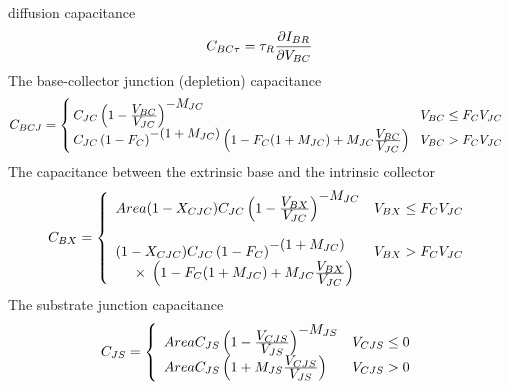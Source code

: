 diffusion capacitance
\begin{equation}
C_{BC\tau} = \tau_R {{\textstyle\partial I_{BR}} \over
       {\textstyle\partial V_{BC}}}
\end{equation}
The base-collector junction (depletion) capacitance
\begin{equation}
C_{BCJ} = \left\{ \! \! \begin{array}{ll}
   C_{JC} \left(1-{{\textstyle V_{BC}}\over
          {\textstyle V_{JC}}}\right)^{\textstyle -M_{JC}}
   & \! V_{BC} \le F_C V_{JC}\\
   C_{JC} \left(1-F_C\right)^{\textstyle -(1+M_{JC})}
          \left(1-F_C(1+M_{JC})+M_{JC}{{\textstyle V_{BC}}\over
          {\textstyle V_{JC}}} \right)
   & \! V_{BC} > F_C V_{JC}
   \end{array} \right. %
\end{equation}
The capacitance between the extrinsic base and the intrinsic
collector
\begin{equation}
C_{BX} = \left\{ \begin{array}{ll}
 Area(1-X_{CJC}) C_{JC} \left(1-{{\textstyle V_{BX}}\over
   {\textstyle V_{JC}}}\right)^{\textstyle -M_{JC}}
   & V_{BX} \le F_C V_{JC}\\ \\
 (1-X_{CJC})
   C_{JC} \left(1-F_C\right)^{\textstyle -(1+M_{JC})}
   & V_{BX} > F_C V_{JC}\\
   \;\;\;\;\;\times\; \left(1-F_C(1+M_{JC})+M_{JC}{{\textstyle V_{BX}}\over
   {\textstyle V_{JC}}} \right)
   &
   \end{array} \right. %
\end{equation}
The substrate junction capacitance
\begin{equation}
C_{JS} = \left\{ \begin{array}{ll}
 Area C_{JS} \left(1-{{\textstyle V_{CJS}}\over
   {\textstyle V_{JS}}}\right)^{\textstyle -M_{JS}}
   & V_{CJS} \le 0\\
   Area C_{JS}
   \left(1+M_{JS}{{\textstyle V_{CJS}}\over
   {\textstyle V_{JS}}} \right)
   & V_{CJS} > 0
   \end{array} \right. %
\end{equation}

